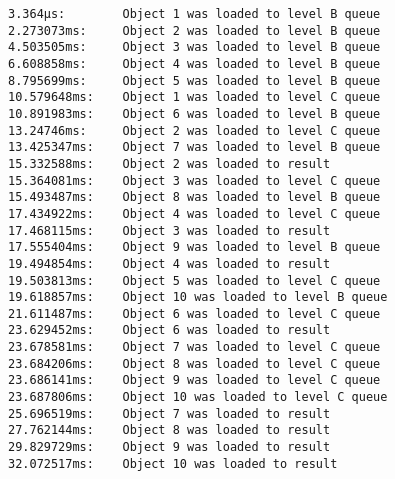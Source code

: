 \begin{lstlisting}[caption={ Пример файла logs}, label={list:logs}]
3.364µs:        Object 1 was loaded to level B queue
2.273073ms:     Object 2 was loaded to level B queue
4.503505ms:     Object 3 was loaded to level B queue
6.608858ms:     Object 4 was loaded to level B queue
8.795699ms:     Object 5 was loaded to level B queue
10.579648ms:    Object 1 was loaded to level C queue
10.891983ms:    Object 6 was loaded to level B queue
13.24746ms:     Object 2 was loaded to level C queue
13.425347ms:    Object 7 was loaded to level B queue
15.332588ms:    Object 2 was loaded to result
15.364081ms:    Object 3 was loaded to level C queue
15.493487ms:    Object 8 was loaded to level B queue
17.434922ms:    Object 4 was loaded to level C queue
17.468115ms:    Object 3 was loaded to result
17.555404ms:    Object 9 was loaded to level B queue
19.494854ms:    Object 4 was loaded to result
19.503813ms:    Object 5 was loaded to level C queue
19.618857ms:    Object 10 was loaded to level B queue
21.611487ms:    Object 6 was loaded to level C queue
23.629452ms:    Object 6 was loaded to result
23.678581ms:    Object 7 was loaded to level C queue
23.684206ms:    Object 8 was loaded to level C queue
23.686141ms:    Object 9 was loaded to level C queue
23.687806ms:    Object 10 was loaded to level C queue
25.696519ms:    Object 7 was loaded to result
27.762144ms:    Object 8 was loaded to result
29.829729ms:    Object 9 was loaded to result
32.072517ms:    Object 10 was loaded to result
\end{lstlisting}
